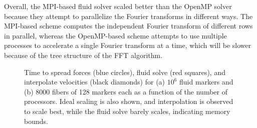 \documentclass[]{article}
\begin{document}
Overall, the MPI-based fluid solver scaled better than the OpenMP solver because they attempt to parallelize the Fourier transforms in different ways. The MPI-based scheme computes the independent Fourier transform of different rows in parallel, whereas the OpenMP-based scheme attempts to use multiple processes to accelerate a single Fourier transform at a time, which will be slower because of the tree structure of the FFT algorithm.
\begin{figure}
\centering     
{}
\caption{Time to spread forces (blue circles), fluid solve (red squares), and interpolate velocities (black diamonds) for (a) $10^6$ fluid markers and (b) 8000 fibers of 128 markers each as a function of the number of processors. Ideal scaling is also shown, and interpolation is observed to scale best, while the fluid solve barely scales, indicating memory bounds. }
\label{fig:Strong}
\end{figure}
\end{document}
